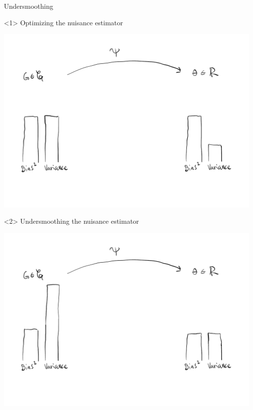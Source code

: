 \documentclass[smaller]{beamer}\usepackage{listings}
\begin{document}
\begin{frame}[label={sec:orgadeffa5}]{Undersmoothing}
\begin{onlyenv}<1>
\center Optimizing the nuisance estimator
\begin{center}
\includegraphics[width=1\textwidth]{./Undersmooth-tradeoff1.pdf}
\end{center}
\end{onlyenv}

\begin{onlyenv}<2>
\center Undersmoothing the nuisance estimator
\begin{center}
\includegraphics[width=1\textwidth]{./Undersmooth-tradeoff2.pdf}
\end{center}
\end{onlyenv}
\end{frame}
\end{document}
